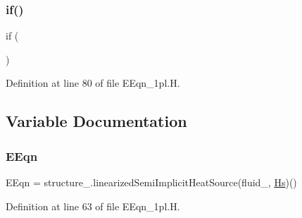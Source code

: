 \mbox{\label{EEqn__1pl_8H_a37319901bc0705f6b6d30d30fdcdf333}} 
\subsubsection{\texorpdfstring{if()}{if()}}
{\footnotesize\ttfamily if (\begin{DoxyParamCaption}\item[{incompressible\+Treatment\+\_\+}]{ }\end{DoxyParamCaption})}



Definition at line 80 of file E\+Eqn\+\_\+1pl.\+H.



\subsection{Variable Documentation}
\mbox{\label{EEqn__1pl_8H_a48cf446ed1abc619ddcfc2b831bf4ed9}} 
\subsubsection{\texorpdfstring{E\+Eqn}{EEqn}}
{\footnotesize\ttfamily E\+Eqn = structure\+\_\+.\+linearized\+Semi\+Implicit\+Heat\+Source(fluid\+\_\+, \hyperlink{EEqn__1pl_8H_ab8fc5669aa3ba2d4b66ff43ff446d633}{Hs})()}



Definition at line 63 of file E\+Eqn\+\_\+1pl.\+H.

